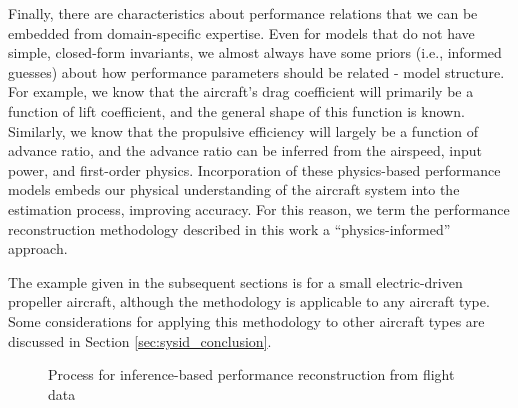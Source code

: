 Finally, there are characteristics about performance relations that we can be embedded from domain-specific expertise. Even for models that do not have simple, closed-form invariants, we almost always have some priors (i.e., informed guesses) about how performance parameters should be related - model structure. For example, we know that the aircraft's drag coefficient will primarily be a function of lift coefficient, and the general shape of this function is known. Similarly, we know that the propulsive efficiency will largely be a function of advance ratio, and the advance ratio can be inferred from the airspeed, input power, and first-order physics. Incorporation of these physics-based performance models embeds our physical understanding of the aircraft system into the estimation process, improving accuracy. For this reason, we term the performance reconstruction methodology described in this work a ``physics-informed'' approach.

The example given in the subsequent sections is for a small electric-driven propeller aircraft, although the methodology is applicable to any aircraft type. Some considerations for applying this methodology to other aircraft types are discussed in Section \ref{sec:sysid_conclusion}.

\begin{figure}[H]
    \centering
    \caption{Process for inference-based performance reconstruction from flight data}
    \label{fig:overall_procedure}
\end{figure}


